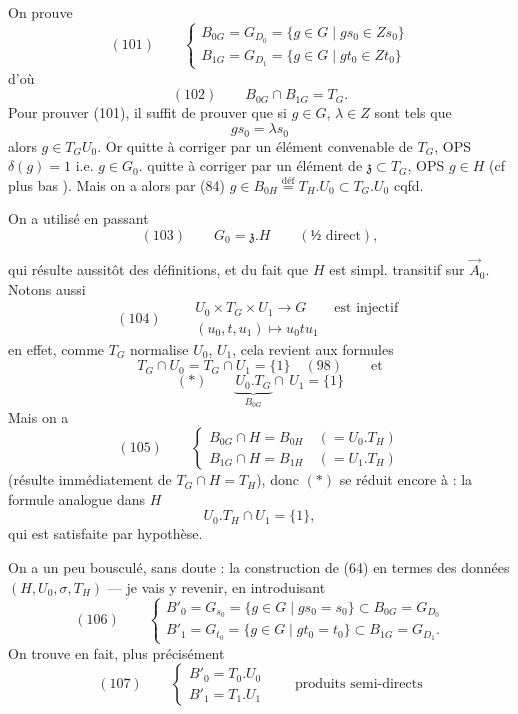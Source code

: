 \documentclass[11pt,a4paper]{article}
\begin{document}
On prouve
\[
(101)\qquad
\begin{cases}
B_{0G} = G_{D_0} = \{g\in G \mid gs_0\in Zs_0\}\\
B_{1G} = G_{D_1} = \{g\in G \mid gt_0\in Zt_0\}
\end{cases}
\]
d'où
\[
(102)\qquad B_{0G}\cap B_{1G} = T_G .
\]
Pour prouver (101), il suffit de prouver que si $g\in G$, \struck{\ill{}} $\lambda\in Z$ sont
tels que
\[
gs_0 = \lambda s_0
\]
alors $g\in T_GU_0$. Or quitte à corriger  par un élément convenable de $T_G$, OPS
$\delta(g) = 1$ i.e. $g\in G_0$.  quitte à corriger par un élément de
$\mathfrak{z}\subset T_G$, OPS $g\in H$ (cf plus bas \ill{}). Mais on a alors par (84)
$g\in B_{0H} \stackrel{\text{déf}}{=} T_H.U_0 \subset T_G.U_0$ cqfd.

On a utilisé en passant
\[
(103)\qquad G_0 = \mathfrak{z}.H \qquad (\text{½ direct}),
\]

qui résulte aussitôt des définitions, et du fait que $H$ est simpl. transitif sur $\vec{A}_0$.
Notons aussi
\[
(104)\qquad
\begin{gathered}
U_0\times T_G\times U_1 \longrightarrow G \qquad \text{est injectif}\\
(u_0,t,u_1) \longmapsto u_0tu_1
\end{gathered}
\]
en effet, comme $T_G$ normalise $U_0$, $U_1$, cela revient aux formules
\[
T_G\cap U_0 = T_G\cap U_1 = \{1\} \quad (98) \qquad \text{et}
\]
\[
(*)\qquad \underbrace{U_0.T_G}_{B_{0G}} \cap\, U_1 = \{1\}
\]
Mais on a
\[
(105)\qquad
\begin{cases}
B_{0G}\cap H = B_{0H} \quad (= U_0.T_H)\\
B_{1G}\cap H = B_{1H} \quad (= U_1.T_H)
\end{cases}
\]
(résulte immédiatement de $T_G\cap H = T_H$), donc $(*)$ se réduit \struck{\ill{}} encore à : la
formule analogue dans $H$
\[
U_0.T_H\cap U_1 = \{1\} ,
\]
qui est satisfaite par hypothèse.

On a un peu bousculé, sans doute : la construction de (64) en termes des données
$(H, U_0, \sigma, T_H)$ — je vais y revenir, en introduisant
\[
(106)\qquad
\begin{cases}
B'_0 = G_{s_0} = \{g\in G \mid gs_0 = s_0\} \subset B_{0G} = G_{D_0}\\
B'_1 = G_{t_0} = \{g\in G \mid gt_0 = t_0\} \subset B_{1G} = G_{D_1} .
\end{cases}
\]
On trouve en fait, plus précisément
\[
(107)\qquad
\begin{cases}
B'_0 = T_0.U_0\\
B'_1 = T_1.U_1
\end{cases}
\qquad \text{produits semi-directs}
\]
\end{document}
